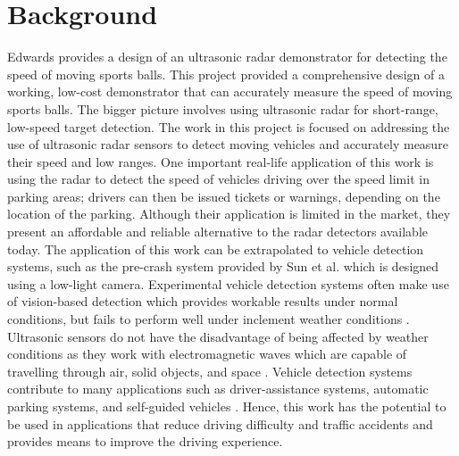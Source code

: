\documentclass[class=report,11pt,crop=false]{standalone}
\begin{document}
\section{Background}
Edwards provides a design of an ultrasonic radar demonstrator for detecting the speed of moving sports balls\cite{ian}. This project provided a comprehensive design of a working, low-cost demonstrator that can accurately measure the speed of moving sports balls. The bigger picture involves using ultrasonic radar for short-range, low-speed target detection. The work in this project is focused on addressing the use of ultrasonic \gls{radar} sensors to detect moving vehicles and accurately measure their speed and low ranges. One important real-life application of this work is using the radar to detect the speed of vehicles driving over the speed limit in parking areas; drivers can then be issued tickets or warnings, depending on the location of the parking. Although their application is limited in the market, they present an affordable and reliable alternative to the radar detectors available today. The application of this work can be extrapolated to vehicle detection systems, such as the pre-crash system provided by Sun et al. \cite{sun} which is designed using a low-light camera. Experimental vehicle detection systems often make use of vision-based detection which provides workable results under normal conditions, but fails to perform well under inclement weather conditions \cite{sun} \cite{cheon}. Ultrasonic sensors do not have the disadvantage of being affected by weather conditions as they work with electromagnetic waves which are capable of travelling through air, solid objects, and space \cite{pomr}. Vehicle detection systems contribute to many applications such as driver-assistance systems, automatic parking systems, and self-guided vehicles \cite{cheon}. Hence, this work has the potential to be used in applications that reduce driving difficulty and traffic accidents and provides means to improve the driving experience.
\end{document}
